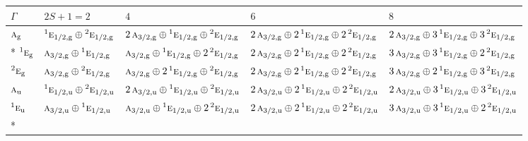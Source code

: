 \documentclass[10pt,a4paper]{article}
\numberwithin{equation}{section}
\newcommand{\irr}[1]{\text{\normalfont\scshape #1}}
\newcommand{\conjpair}[1]{{}^{#1}}
\newcommand{\ptag}[1]{\mathrm{#1}}
\begin{document}
{\small\setlength{\tabcolsep}{3pt}\begin{longtable}{@{}l>{\RaggedRight\arraybackslash}p{}>{\RaggedRight\arraybackslash}p{}>{\RaggedRight\arraybackslash}p{}>{\RaggedRight\arraybackslash}p{}@{}}\toprule
$\Gamma$ & $2S + 1 = 2$ & $4$ & $6$ & $8$\\\midrule\endhead
\bottomrule\endfoot\endlastfoot
$\irr{a}_{\ptag{g}}$ & $\conjpair{1}\irr{e}_{1/2,\ptag{g}}\oplus \conjpair{2}\irr{e}_{1/2,\ptag{g}}$ & $2\,\irr{a}_{3/2,\ptag{g}}\oplus \conjpair{1}\irr{e}_{1/2,\ptag{g}}\oplus \conjpair{2}\irr{e}_{1/2,\ptag{g}}$ & $2\,\irr{a}_{3/2,\ptag{g}}\oplus 2\,\conjpair{1}\irr{e}_{1/2,\ptag{g}}\oplus 2\,\conjpair{2}\irr{e}_{1/2,\ptag{g}}$ & $2\,\irr{a}_{3/2,\ptag{g}}\oplus 3\,\conjpair{1}\irr{e}_{1/2,\ptag{g}}\oplus 3\,\conjpair{2}\irr{e}_{1/2,\ptag{g}}$\\*
$\conjpair{1}\irr{e}_{\ptag{g}}$ & $\irr{a}_{3/2,\ptag{g}}\oplus \conjpair{1}\irr{e}_{1/2,\ptag{g}}$ & $\irr{a}_{3/2,\ptag{g}}\oplus \conjpair{1}\irr{e}_{1/2,\ptag{g}}\oplus 2\,\conjpair{2}\irr{e}_{1/2,\ptag{g}}$ & $2\,\irr{a}_{3/2,\ptag{g}}\oplus 2\,\conjpair{1}\irr{e}_{1/2,\ptag{g}}\oplus 2\,\conjpair{2}\irr{e}_{1/2,\ptag{g}}$ & $3\,\irr{a}_{3/2,\ptag{g}}\oplus 3\,\conjpair{1}\irr{e}_{1/2,\ptag{g}}\oplus 2\,\conjpair{2}\irr{e}_{1/2,\ptag{g}}$\\
$\conjpair{2}\irr{e}_{\ptag{g}}$ & $\irr{a}_{3/2,\ptag{g}}\oplus \conjpair{2}\irr{e}_{1/2,\ptag{g}}$ & $\irr{a}_{3/2,\ptag{g}}\oplus 2\,\conjpair{1}\irr{e}_{1/2,\ptag{g}}\oplus \conjpair{2}\irr{e}_{1/2,\ptag{g}}$ & $2\,\irr{a}_{3/2,\ptag{g}}\oplus 2\,\conjpair{1}\irr{e}_{1/2,\ptag{g}}\oplus 2\,\conjpair{2}\irr{e}_{1/2,\ptag{g}}$ & $3\,\irr{a}_{3/2,\ptag{g}}\oplus 2\,\conjpair{1}\irr{e}_{1/2,\ptag{g}}\oplus 3\,\conjpair{2}\irr{e}_{1/2,\ptag{g}}$\\
$\irr{a}_{\ptag{u}}$ & $\conjpair{1}\irr{e}_{1/2,\ptag{u}}\oplus \conjpair{2}\irr{e}_{1/2,\ptag{u}}$ & $2\,\irr{a}_{3/2,\ptag{u}}\oplus \conjpair{1}\irr{e}_{1/2,\ptag{u}}\oplus \conjpair{2}\irr{e}_{1/2,\ptag{u}}$ & $2\,\irr{a}_{3/2,\ptag{u}}\oplus 2\,\conjpair{1}\irr{e}_{1/2,\ptag{u}}\oplus 2\,\conjpair{2}\irr{e}_{1/2,\ptag{u}}$ & $2\,\irr{a}_{3/2,\ptag{u}}\oplus 3\,\conjpair{1}\irr{e}_{1/2,\ptag{u}}\oplus 3\,\conjpair{2}\irr{e}_{1/2,\ptag{u}}$\\
$\conjpair{1}\irr{e}_{\ptag{u}}$ & $\irr{a}_{3/2,\ptag{u}}\oplus \conjpair{1}\irr{e}_{1/2,\ptag{u}}$ & $\irr{a}_{3/2,\ptag{u}}\oplus \conjpair{1}\irr{e}_{1/2,\ptag{u}}\oplus 2\,\conjpair{2}\irr{e}_{1/2,\ptag{u}}$ & $2\,\irr{a}_{3/2,\ptag{u}}\oplus 2\,\conjpair{1}\irr{e}_{1/2,\ptag{u}}\oplus 2\,\conjpair{2}\irr{e}_{1/2,\ptag{u}}$ & $3\,\irr{a}_{3/2,\ptag{u}}\oplus 3\,\conjpair{1}\irr{e}_{1/2,\ptag{u}}\oplus 2\,\conjpair{2}\irr{e}_{1/2,\ptag{u}}$\\*

\end{longtable}}
\end{document}
